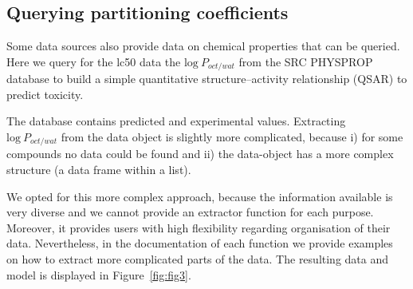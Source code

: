 \subsection[Querying partitioning coefficients]{Querying partitioning coefficients}
Some data sources also provide data on chemical properties that can be queried.
Here we query for the lc50 data the $\mathrm{log}~P_{oct/wat}$ from the SRC PHYSPROP database to build a simple quantitative structure–activity relationship (QSAR) to predict toxicity.

\begin{knitrout}
\color{fgcolor}\begin{kframe}
\begin{alltt}
 \hlkwb{<-} \hlopt{$}
\end{alltt}
\end{kframe}
\end{knitrout}

The database contains predicted and experimental values.
Extracting \\ $\mathrm{log}~P_{oct/wat}$ from the data object is slightly more complicated,  
because i) for some compounds no data could be found and ii) the data-object has a more complex structure (a data frame within a list).

\begin{knitrout}
\color{fgcolor}\begin{kframe}
\begin{alltt}
\hlopt{$} \hlkwb{<-}  \hlstd{(}\hlstd{) \{}
   \hlstd{(} \hlopt{==}  \hlopt{&&} 
    \hlstd{(}\hlstd{)}
  \hlopt{$}\hlopt{$}\hlstd{value[y}\hlopt{$}\hlopt{$} \hlopt{==} \hlstd{]}
\hlstd{\})}
\end{alltt}
\end{kframe}
\end{knitrout}

We opted for this more complex approach, because the information available is very diverse and we cannot provide an extractor function for each purpose.
Moreover, it provides users with high flexibility regarding organisation of their data. 
Nevertheless, in the documentation of each function we provide examples on how to extract more complicated parts of the data.
The resulting data and model is displayed in Figure~\ref{fig:fig3}.


